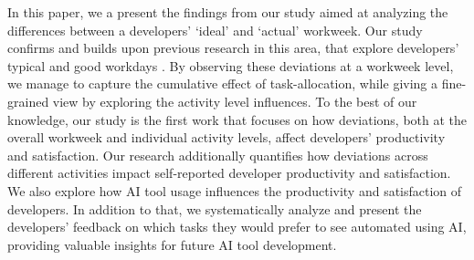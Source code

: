 In this paper, we a present the findings from our study aimed at analyzing the differences between a developers' `ideal' and `actual' workweek.
Our study confirms and builds upon previous research in this area, that explore developers' typical and good workdays \cite{8666786}. By observing these deviations at a workweek level, we manage to capture the cumulative effect of task-allocation, while giving a fine-grained view by exploring the activity level influences. 
To the best of our knowledge, our study is the first work that focuses on how deviations, both at the overall workweek and individual activity levels, affect developers' productivity and satisfaction. Our research additionally quantifies how deviations across different activities impact self-reported developer productivity and satisfaction. We also explore how AI tool usage influences the productivity and satisfaction of developers. In addition to that, we systematically analyze and present the developers' feedback on which tasks they would prefer to see automated using AI, providing valuable insights for future AI tool development. 